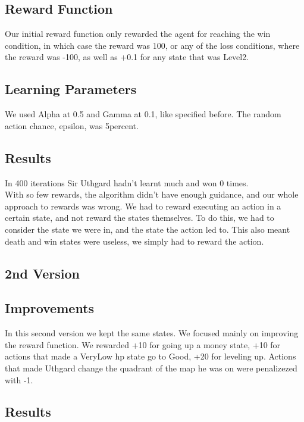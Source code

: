\documentclass{article}
\begin{document}
  \subsection{Reward Function}

  Our initial reward function only rewarded the agent for reaching the win condition, in which case the reward was 100, or any of the loss conditions,
  where the reward was -100, as well as +0.1 for any state that was Level2.\\

  \subsection{Learning Parameters}

  We used Alpha at 0.5 and Gamma at 0.1, like specified before. The random action chance, epsilon, was 5percent.\\

  \subsection{Results}

  In 400 iterations Sir Uthgard hadn't learnt much and won 0 times.\\
  With so few rewards, the algorithm didn't have enough guidance, and our whole approach to rewards was wrong. 
  We had to reward executing an action in a certain state, and not reward the states themselves. To do this, we had to consider the state we were in, and the state the action led to. 
  This also meant death and win states were useless, we simply had to reward the action.\\

  \subsection{2nd Version}

  \subsection{Improvements}

  In this second version we kept the same states. We focused mainly on improving the reward function.
  We rewarded +10 for going up a money state, +10 for actions that made a VeryLow hp state go to Good, +20 for leveling up. 
  Actions that made Uthgard change the quadrant of the map he was on were penalizezed with -1.

  \subsection{Results}
\end{document}
